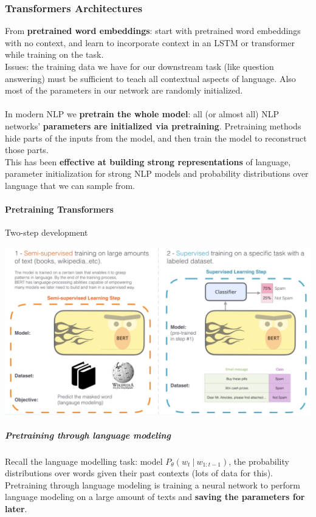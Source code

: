 \documentclass[10pt]{report}
\begin{document}
\subsubsection{Transformers Architectures}
From \textbf{pretrained word embeddings}: start with pretrained word embeddings with no context, and learn to incorporate context in an LSTM or transformer while training on the task.\\
Issues: the training data we have for our downstream task (like question answering) must be sufficient to teach all contextual aspects of language. Also most of the parameters in our network are randomly initialized.\\\\
In modern NLP we \textbf{pretrain the whole model}: all (or almost all) NLP networks' \textbf{parameters are initialized via pretraining}. Pretraining methods hide parts of the inputs from the model, and then train the model to reconstruct those parts.\\
This has been \textbf{effective at building strong representations} of language, parameter initialization for strong NLP models and probability distributions over language that we can sample from.
\paragraph{Pretraining Transformers} Two-step development\begin{center}
	\includegraphics[scale=0.5]{74.png}
\end{center}
\subparagraph{Pretraining through language modeling} Recall the language modelling task: model $P_\theta(w_t\:|\:w_{1:t-1})$, the probability distributions over words given their past contexts (lots of data for this).\\Pretraining through language modeling is training a neural network to perform language modeling on a large amount of texts and \textbf{saving the parameters for later}.
\end{document}
